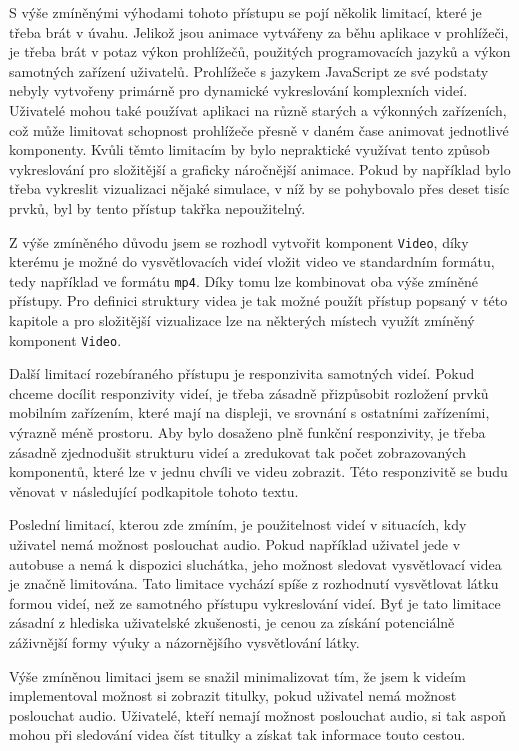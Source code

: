 S výše zmíněnými výhodami tohoto přístupu se pojí několik limitací, které je třeba brát v úvahu. Jelikož jsou animace vytvářeny za běhu aplikace v prohlížeči, je třeba brát v potaz výkon prohlížečů, použitých programovacích jazyků a výkon samotných zařízení uživatelů. Prohlížeče s jazykem JavaScript ze své podstaty nebyly vytvořeny primárně pro dynamické vykreslování komplexních videí. Uživatelé mohou také používat aplikaci na různě starých a výkonných zařízeních, což může limitovat schopnost prohlížeče přesně v daném čase animovat jednotlivé komponenty. Kvůli těmto limitacím by bylo nepraktické využívat tento způsob vykreslování pro složitější a graficky náročnější animace. Pokud by například bylo třeba vykreslit vizualizaci nějaké simulace, v níž by se pohybovalo přes deset tisíc prvků, byl by tento přístup takřka nepoužitelný.

Z výše zmíněného důvodu jsem se rozhodl vytvořit komponent \texttt{Video}, díky kterému je možné do vysvětlovacích videí vložit video ve standardním formátu, tedy například ve formátu \texttt{mp4}. Díky tomu lze kombinovat oba výše zmíněné přístupy. Pro definici struktury videa je tak možné použít přístup popsaný v této kapitole a pro složitější vizualizace lze na některých místech využít zmíněný komponent \texttt{Video}.

Další limitací rozebíraného přístupu je responzivita samotných videí. Pokud chceme docílit responzivity videí, je třeba zásadně přizpůsobit rozložení prvků mobilním zařízením, které mají na displeji, ve srovnání s ostatními zařízeními, výrazně méně prostoru. Aby bylo dosaženo plně funkční responzivity, je třeba zásadně zjednodušit strukturu videí a zredukovat tak počet zobrazovaných komponentů, které lze v jednu chvíli ve videu zobrazit. Této responzivitě se budu věnovat v následující podkapitole tohoto textu.

Poslední limitací, kterou zde zmíním, je použitelnost videí v situacích, kdy uživatel nemá možnost poslouchat audio. Pokud například uživatel jede v autobuse a nemá k dispozici sluchátka, jeho možnost sledovat vysvětlovací videa je značně limitována. Tato limitace vychází spíše z rozhodnutí vysvětlovat látku formou videí, než ze samotného přístupu vykreslování videí. Byť je tato limitace zásadní z hlediska uživatelské zkušenosti, je cenou za získání potenciálně záživnější formy výuky a názornějšího vysvětlování látky.

Výše zmíněnou limitaci jsem se snažil minimalizovat tím, že jsem k videím implementoval možnost si zobrazit titulky, pokud uživatel nemá možnost poslouchat audio. Uživatelé, kteří nemají možnost poslouchat audio, si tak aspoň mohou při sledování videa číst titulky a získat tak informace touto cestou.


